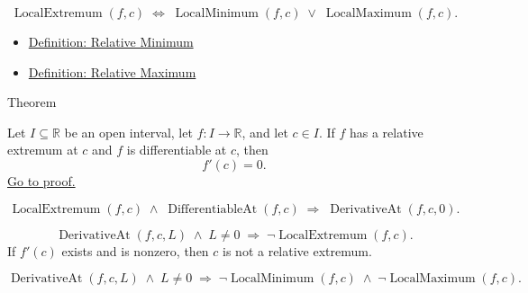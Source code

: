 \begin{remark*}
\[
\operatorname{LocalExtremum}(f, c)
\;\Longleftrightarrow\;
\operatorname{LocalMinimum}(f, c) \;\lor\; \operatorname{LocalMaximum}(f, c).
\]
\end{remark*}

\begin{dependencies}
\begin{itemize}
  \item \hyperref[def:relative-minimum]{Definition: Relative Minimum}
  \item \hyperref[def:relative-maximum]{Definition: Relative Maximum}
\end{itemize}
\end{dependencies}


\begin{theorembox}{Theorem}
\begin{theorem}
\label{thm:interior-extremum-theorem}
Let $I \subseteq \mathbb{R}$ be an open interval, let $f : I \to \mathbb{R}$, and let $c \in I$.
If $f$ has a relative extremum at $c$ and $f$ is differentiable at $c$, then
\[
f'(c) = 0.
\]
\hyperref[prf:interior-extremum-theorem]{Go to proof.}
\end{theorem}
\end{theorembox}

\begin{remark*}
\[
\operatorname{LocalExtremum}(f, c) \;\land\; \operatorname{DifferentiableAt}(f, c)
\;\Rightarrow\; \operatorname{DerivativeAt}(f, c, 0).
\]
\end{remark*}

\begin{remark*}
\[
\operatorname{DerivativeAt}(f, c, L) \;\land\; L \neq 0
\;\Rightarrow\; \lnot\operatorname{LocalExtremum}(f, c).
\]
If $f'(c)$ exists and is nonzero, then $c$ is not a relative extremum.
\end{remark*}

\begin{remark*}
\[
\operatorname{DerivativeAt}(f, c, L) \;\land\; L \neq 0
\;\Rightarrow\;
\lnot\operatorname{LocalMinimum}(f, c) \;\land\; \lnot\operatorname{LocalMaximum}(f, c).
\]
\end{remark*}

